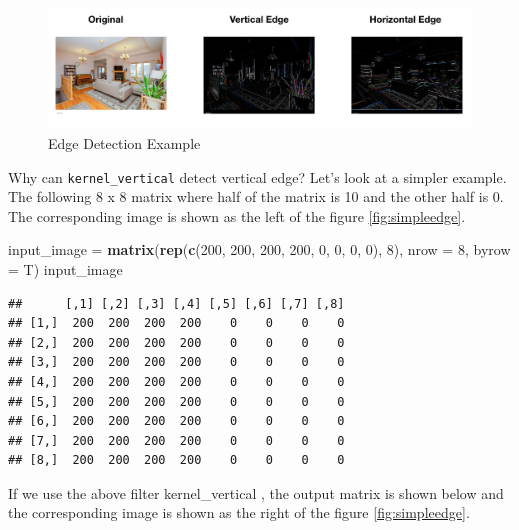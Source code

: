 \documentclass[12pt,]{krantz}
\makeatletter
\newenvironment{Shaded}{\begin{snugshade}}{\end{snugshade}}
\newcommand{\DataTypeTok}[1]{\textcolor[rgb]{0.27,0.27,0.27}{#1}}
\newcommand{\DecValTok}[1]{\textcolor[rgb]{0.06,0.06,0.06}{#1}}
\newcommand{\KeywordTok}[1]{\textcolor[rgb]{0.27,0.27,0.27}{\textbf{#1}}}
\newcommand{\NormalTok}[1]{#1}
\newcommand{\StringTok}[1]{\textcolor[rgb]{0.5,0.5,0.5}{#1}}
\newenvironment{kframe}{%
\medskip{}
\setlength{\fboxsep}{.8em}
 \def\at@end@of@kframe{}%
 \ifinner\ifhmode%
  \def\at@end@of@kframe{\end{minipage}}%
  \begin{minipage}{\columnwidth}%
 \fi\fi%
 \def\FrameCommand##1{\hskip\@totalleftmargin \hskip-\fboxsep
 \colorbox{shadecolor}{##1}\hskip-\fboxsep
     \hskip-\linewidth \hskip-\@totalleftmargin \hskip\columnwidth}%
 \MakeFramed {\advance\hsize-\width
   \@totalleftmargin\z@ \linewidth\hsize
   \@setminipage}}%
 {\par\unskip\endMakeFramed%
 \at@end@of@kframe}
\renewenvironment{Shaded}{\begin{kframe}}{\end{kframe}}
\makeatother
\begin{document}
\begin{figure}

{\centering \includegraphics[width=1\linewidth]{images/edgedet5} 

}

\caption{Edge Detection Example}\label{fig:edgedetection}
\end{figure}

Why can \texttt{kernel\_vertical} detect vertical edge? Let's look at a simpler example. The following 8 x 8 matrix where half of the matrix is 10 and the other half is 0. The corresponding image is shown as the left of the figure \ref{fig:simpleedge}.

\begin{Shaded}
\begin{Highlighting}[]
\NormalTok{input_image =}\StringTok{ }\KeywordTok{matrix}\NormalTok{(}\KeywordTok{rep}\NormalTok{(}\KeywordTok{c}\NormalTok{(}\DecValTok{200}\NormalTok{, }\DecValTok{200}\NormalTok{, }\DecValTok{200}\NormalTok{, }\DecValTok{200}\NormalTok{, }\DecValTok{0}\NormalTok{, }\DecValTok{0}\NormalTok{, }\DecValTok{0}\NormalTok{, }\DecValTok{0}\NormalTok{), }\DecValTok{8}\NormalTok{), }
                     \DataTypeTok{nrow =} \DecValTok{8}\NormalTok{, }\DataTypeTok{byrow =}\NormalTok{ T)}
\NormalTok{input_image}
\end{Highlighting}
\end{Shaded}

\begin{verbatim}
##      [,1] [,2] [,3] [,4] [,5] [,6] [,7] [,8]
## [1,]  200  200  200  200    0    0    0    0
## [2,]  200  200  200  200    0    0    0    0
## [3,]  200  200  200  200    0    0    0    0
## [4,]  200  200  200  200    0    0    0    0
## [5,]  200  200  200  200    0    0    0    0
## [6,]  200  200  200  200    0    0    0    0
## [7,]  200  200  200  200    0    0    0    0
## [8,]  200  200  200  200    0    0    0    0
\end{verbatim}

If we use the above filter kernel\_vertical , the output matrix is shown below and the corresponding image is shown as the right of the figure \ref{fig:simpleedge}.
\end{document}
